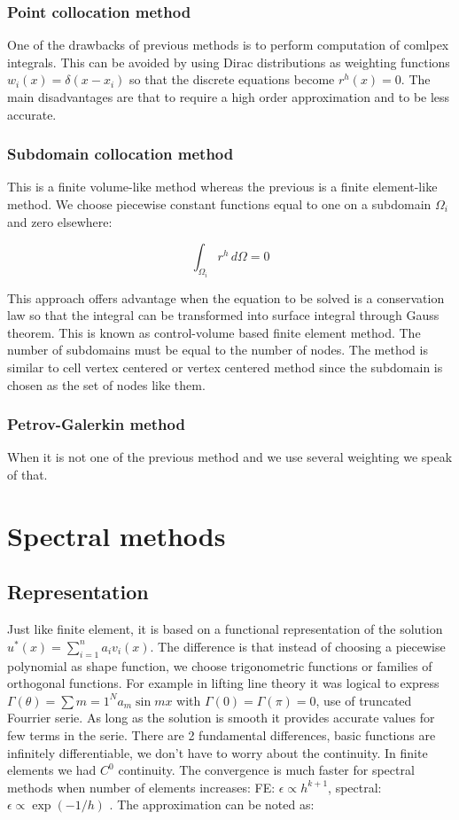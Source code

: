 \subsubsection{Point collocation method}
One of the drawbacks of previous methods is to perform computation of comlpex integrals. This can be avoided by using Dirac distributions as weighting functions $w_i (x) = \delta (x-x_i)$ so that the discrete equations become $r^h (x) = 0$. The main disadvantages are that to require a high order approximation and to be less accurate.   

\subsubsection{Subdomain collocation method}
This is a finite volume-like method whereas the previous is a finite element-like method. We choose piecewise constant functions equal to one on a subdomain $\Omega _i$ and zero elsewhere: 

\begin{equation}
\int _{\Omega  _i} r^h \, d\Omega = 0
\end{equation}

This approach offers advantage when the equation to be solved is a conservation law so that the integral can be transformed into surface integral through Gauss theorem. This is known as control-volume based finite element method. The number of subdomains must be equal to the number of nodes. The method is similar to cell vertex centered or vertex centered method since the subdomain is chosen as the set of nodes like them.

\subsubsection{Petrov-Galerkin method}
When it is not one of the previous method and we use several weighting we speak of that. 

\section{Spectral methods}
\subsection{Representation}
Just like finite element, it is based on a functional representation of the solution $u^* (x) = \sum _{i=1}^n a_i v_i (x)$. The difference is that instead of choosing a piecewise polynomial as shape function, we choose trigonometric functions or families of orthogonal functions. For example in lifting line theory it was logical to express $\Gamma (\theta) = \sum {m=1}^N a_m \sin mx$ with $\Gamma (0) = \Gamma (\pi) = 0$, use of truncated Fourrier serie.  As long as the solution is smooth it provides accurate values for few terms in the serie. There are 2 fundamental differences, basic functions are infinitely differentiable, we don’t have to worry about the continuity. In finite elements we had $C^0$ continuity. The convergence is much faster for spectral methods when number of elements increases: FE: $\epsilon \propto h^{k+1}$, spectral: $\epsilon \propto \exp(-1/h)$ . The approximation can be noted as:

